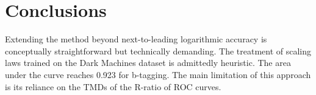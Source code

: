 \section{Conclusions}\label{sec:conclusions}

Extending the method beyond next-to-leading logarithmic accuracy is
conceptually straightforward but technically demanding. The treatment of
scaling laws trained on the Dark Machines dataset is admittedly
heuristic. The area under the curve reaches 0.923 for b-tagging. The
main limitation of this approach is its reliance on the TMDs of the
R-ratio of ROC curves.

